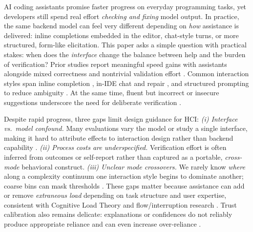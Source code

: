 \documentclass[sigconf]{acmart}
\begin{document}
AI coding assistants promise faster progress on everyday programming tasks, yet developers still spend real effort \emph{checking and fixing} model output. In practice, the same backend model can feel very different depending on \emph{how} assistance is delivered: inline completions embedded in the editor, chat-style turns, or more structured, form-like elicitation. This paper asks a simple question with practical stakes: when does the \emph{interface} change the balance between help and the burden of verification? Prior studies report meaningful speed gains with assistants alongside mixed correctness and nontrivial validation effort \cite{vaithilingam2022expectation,peng2023impact,liang2024large,sergeyuk2025using}. Common interaction styles span inline completion \cite{svyatkovskiy2020intellicode}, in-IDE chat and repair \cite{nam2024using,tang2023empirical,asare2024user}, and structured prompting to reduce ambiguity \cite{vasconcelos2025generation,liu2023wants,brender2025structured,sasaki2025landscape}. At the same time, fluent but incorrect or insecure suggestions underscore the need for deliberate verification \cite{pearce2025asleep,perry2023users,asare2024user}.

Despite rapid progress, three gaps limit design guidance for HCI:
\emph{(i) Interface vs.\ model confound.} Many evaluations vary the model or study a single interface, making it hard to attribute effects to interaction design rather than backend capability \cite{vasconcelos2025generation,jiang2024analysis}. 
\emph{(ii) Process costs are underspecified.} Verification effort is often inferred from outcomes or self-report rather than captured as a portable, \emph{cross-mode} behavioral construct. 
\emph{(iii) Unclear mode crossovers.} We rarely know \emph{where} along a complexity continuum one interaction style begins to dominate another; coarse bins can mask thresholds \cite{jiang2024analysis}. These gaps matter because assistance can add or remove \emph{extraneous load} depending on task structure and user expertise, consistent with Cognitive Load Theory and flow/interruption research \cite{kalyuga2007expertise,sweller2019cognitive,mark2008cost,parnin2011resumption,meyer2019today,meyer2020detecting}. Trust calibration also remains delicate: explanations or confidences do not reliably produce appropriate reliance and can even increase over‑reliance \cite{parasuraman1997humans,lee2004trust,yin2019understanding,bansal2021does,vered2023effects}.
\end{document}
